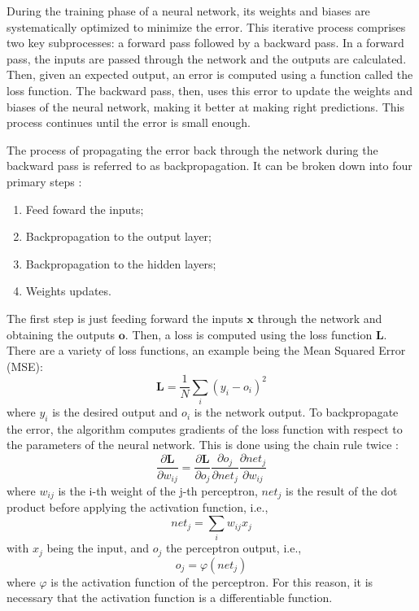 During the training phase of a neural network, its weights and biases are systematically optimized to minimize the error. This iterative process comprises two key subprocesses: a forward pass followed by a backward pass. In a forward pass, the inputs are passed through the network and the outputs are calculated. Then, given an expected output, an error is computed using a function called the loss function. The backward pass, then, uses this error to update the weights and biases of the neural network, making it better at making right predictions. This process continues until the error is small enough.

The process of propagating the error back through the network during the backward pass is referred to as backpropagation. It can be broken down into four primary steps \cite{cilimkovic2015neural}:

\begin{enumerate}
    \item Feed foward the inputs;
    \item Backpropagation to the output layer;
    \item Backpropagation to the hidden layers;
    \item Weights updates.
\end{enumerate}

The first step is just feeding forward the inputs $\mathbf{x}$ through the network and obtaining the outputs $\mathbf{o}$. Then, a loss is computed using the loss function $\mathbf{L}$. There are a variety of loss functions, an example being the Mean Squared Error (MSE):
\begin{equation}
    \mathbf{L} = \frac{1}{N} \sum_{i} \left(y_i-o_i\right)^2
\end{equation}
where $y_i$ is the desired output and $o_i$ is the network output. To backpropagate the error, the algorithm computes gradients of the loss function with respect to the parameters of the neural network. This is done using the chain rule twice \cite{Roth_2016}:
\begin{equation}
    \frac{\partial \mathbf{L}}{\partial w_{ij}} = \frac{\partial \mathbf{L}}{\partial o_j}
    \frac{\partial o_j}{\partial net_j}\frac{\partial net_j}{\partial w_{ij}}
\end{equation}
where $w_{ij}$ is the i-th weight of the j-th perceptron, $net_j$ is the result of the dot product before applying the activation function, i.e.,
\begin{equation}
    net_j = \sum_i w_{ij} x_j
\end{equation}
with $x_j$ being the input, and $o_j$ the perceptron output, i.e.,
\begin{equation}
    o_j = \varphi (net_j)    
\end{equation}
where $\varphi$ is the activation function of the perceptron. For this reason, it is necessary that the activation function is a differentiable function. 


